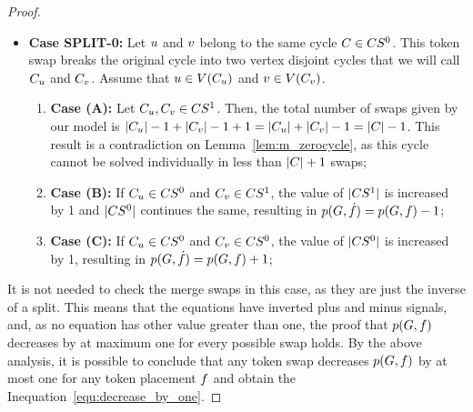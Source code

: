 \documentclass[msc,english,table,xcdraw]{ppgccufmg}
\begin{document}
\begin{proof}
\begin{itemize}
    \item \textbf{Case SPLIT-0:} Let $u$ and $v$ belong to 
    the same cycle $C \in CS^{0}$. 
    This token swap breaks the original cycle into two vertex disjoint cycles that
    we will call $C_{u}$ and $C_{v}$.
    Assume that $u \in V(C_{u})$ and 
    $v \in V(C_{v})$.
    
    \begin{enumerate}
        \item[] \textbf{Case (A):} Let $C_{u},C_{v} \in CS^{1}$.
        Then, the total number of swaps given by our model is $|C_{u}| - 1 + 
        |C_{v}| - 1 + 1 = |C_{u}| + 
        |C_{v}| - 1 = |C| - 1$.
        This result is a contradiction on Lemma~\ref{lem:m_zerocycle}, as this cycle
        cannot be solved individually in less than $|C| + 1$ swaps;
        \item[] \textbf{Case (B):} If $C_{u} \in CS^{0}$ and 
        $C_{v} \in CS^{1}$, the value of $|CS^{1}|$ 
        is increased by 1 and $|CS^{0}|$ continues the same, 
        resulting in $p(G, \dot{f}) = p(G, f) - 1$;
        \item[] \textbf{Case (C):} If $C_{u} \in CS^{0}$ and 
        $C_{v} \in CS^{0}$, the value of $|CS^{0}|$ 
        is increased by 1, resulting in $p(G, \dot{f}) 
        = p(G, f) + 1$;
    \end{enumerate}
    
    \end{itemize}
    
    It is not needed to check the merge swaps in this case, as they are just the inverse
    of a split.
    This means that the equations have inverted plus and minus signals, and, as no equation
    has other value greater than one, the proof that $p(G, f)$
    decreases by at maximum one for every possible swap holds.
    By the above analysis, it is possible to conclude that any token swap decreases
    $p(G, f)$ by at most one for any token placement $f$ and
    obtain the Inequation~\ref{equ:decrease_by_one}.
    

\end{proof}
\end{document}
